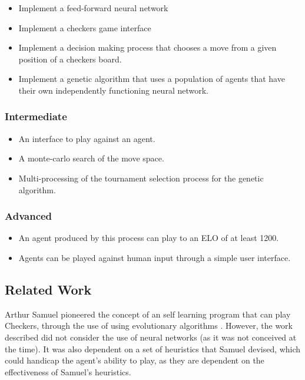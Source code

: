 \documentclass[12pt,a4paper]{article}
\begin{document}
    \begin{itemize}
    \item Implement a feed-forward neural network
    \item Implement a checkers game interface
    \item Implement a decision making process that chooses a move from a given position of a checkers board.
    \item Implement a genetic algorithm that uses a population of agents that have their own independently functioning neural network.
    \end{itemize}

    \subsubsection*{Intermediate}

    \begin{itemize}
    \item An interface to play against an agent.
    \item A monte-carlo search of the move space.
    \item Multi-processing of the tournament selection process for the genetic algorithm.
    \end{itemize}

    \subsubsection*{Advanced}

    \begin{itemize}
    \item An agent produced by this process can play to an ELO of at least 1200.
    \item Agents can be played against human input through a simple user interface.
    \end{itemize}

\subsection*{Related Work}

    Arthur Samuel pioneered the concept of an self learning program that can play Checkers, through the use of using evolutionary algorithms \cite{samuel_studies_2000}. However, the work described did not consider the use of neural networks (as it was not conceived at the time). It was also  dependent on a set of heuristics that Samuel devised, which could handicap  the agent's ability to play, as they are dependent on the effectiveness of Samuel's heuristics. 
\end{document}
